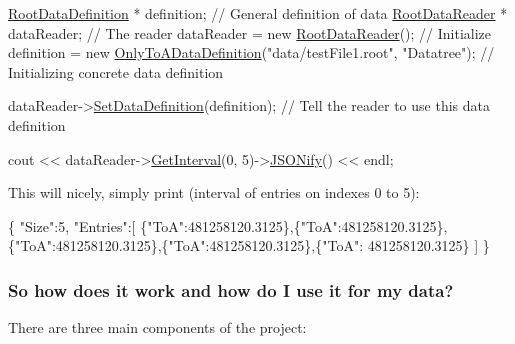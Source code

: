 \begin{DoxyCode}
\hyperlink{classRootDataDefinition}{RootDataDefinition} * definition;        \textcolor{comment}{// General definition of data }
\hyperlink{classRootDataReader}{RootDataReader} * dataReader;            \textcolor{comment}{// The reader}
dataReader = \textcolor{keyword}{new} \hyperlink{classRootDataReader}{RootDataReader}();      \textcolor{comment}{// Initialize}
definition = \textcolor{keyword}{new} \hyperlink{classOnlyToADataDefinition}{OnlyToADataDefinition}(\textcolor{stringliteral}{"data/testFile1.root"}, \textcolor{stringliteral}{"Datatree"});  \textcolor{comment}{//
       Initializing concrete data definition}

dataReader->\hyperlink{classRootDataReader_ad670745df69f90ea6578d7c29cab716f}{SetDataDefinition}(definition);  \textcolor{comment}{// Tell the reader to use this data definition}

cout << dataReader->\hyperlink{classRootDataReader_a76a02dd2cc6f4cde896ce9180048671b}{GetInterval}(0, 5)->\hyperlink{classDataEntryInterval_ad27bffbb603c300714090c809ee58570}{JSONify}() << endl;
\end{DoxyCode}
 This will nicely, simply print (interval of entries on indexes 0 to 5)\+: 
\begin{DoxyCode}
\{
  \textcolor{stringliteral}{"Size"}:5,
  \textcolor{stringliteral}{"Entries"}:[
    \{\textcolor{stringliteral}{"ToA"}:481258120.3125\},\{\textcolor{stringliteral}{"ToA"}:481258120.3125\},\{\textcolor{stringliteral}{"ToA"}:481258120.3125\},\{\textcolor{stringliteral}{"ToA"}:481258120.3125\},\{\textcolor{stringliteral}{"ToA"}:
      481258120.3125\}
  ]
\}
\end{DoxyCode}
 \subsubsection*{So how does it work and how do I use it for my data?}

There are three main components of the project\+:


